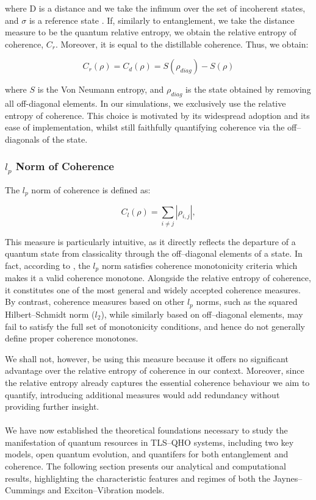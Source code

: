 \documentclass[12pt]{article}
\begin{document}
where D is a distance and we take the infimum over the set of incoherent states, and $\sigma$ is a reference state \cite{Coherence2017-Colloquium}. If, similarly to entanglement, we take the distance measure to be the quantum relative entropy, we obtain the relative entropy of coherence, $C_r$. Moreover, it is equal to the distillable coherence. Thus, we obtain:

\begin{equation} \label{rel_ent_coh}
C_r(\rho) = C_d(\rho) = S(\rho_{diag}) - S(\rho)
\end{equation}

where $S$ is the Von Neumann entropy, and $\rho_{diag}$ is the state obtained by removing all off-diagonal elements. In our simulations, we exclusively use the relative entropy of coherence. This choice is motivated by its widespread adoption and its ease of implementation, whilst still faithfully quantifying coherence via the off--diagonals of the state.

\subsubsection{$l_p$ Norm of Coherence}

The $l_p$ norm of coherence is defined as:

\begin{equation}
    C_l(\rho) = \sum_{i\neq j} |\rho_{i,j}|, 
\end{equation}

This measure is particularly intuitive, as it directly reflects the departure of a quantum state from classicality through the off--diagonal elements of a state. In fact, according to \cite{Coherence2014-seed}, the $l_p$ norm satisfies coherence monotonicity criteria which makes it a valid coherence monotone. Alongside the relative entropy of coherence, it constitutes one of the most general and widely accepted coherence measures. By contrast, coherence measures based on other $l_p$ norms, such as the squared Hilbert–Schmidt norm ($l_2$), while similarly based on off--diagonal elements, may fail to satisfy the full set of monotonicity conditions, and hence do not generally define proper coherence monotones.

We shall not, however, be using this measure because it offers no significant advantage over the relative entropy of coherence in our context. Moreover, since the relative entropy already captures the essential coherence behaviour we aim to quantify, introducing additional measures would add redundancy without providing further insight.\\
\\
We have now established the theoretical foundations necessary to study the manifestation of quantum resources in TLS--QHO systems, including two key models, open quantum evolution, and quantifers for both entanglement and coherence. The following section presents our analytical and computational results, highlighting the characteristic features and regimes of both the Jaynes--Cummings and Exciton--Vibration models. 
\end{document}
